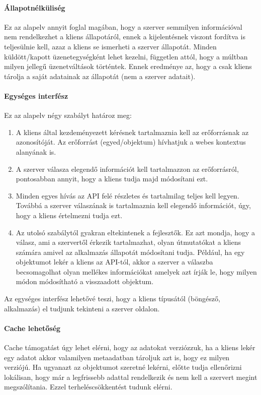 \paragraph{Állapotnélküliség} Ez az alapelv annyit foglal magában, hogy a szerver semmilyen információval nem rendelkezhet a kliens állapotáról, ennek a kijelentésnek viszont fordítva is teljesülnie kell, azaz a kliens se ismerheti a szerver állapotát. Minden küldött/kapott üzenetegységként lehet kezelni, független attól, hogy a múltban milyen jellegű üzenetváltások történtek. Ennek eredménye az, hogy a csak kliens tárolja a saját adatainak az állapotát (nem a szerver adatait).
\paragraph{Egységes interfész} Ez az alapelv négy szabályt határoz meg:
\begin{enumerate}
		\item A kliens által kezdeményezett kérésnek tartalmaznia kell az erőforrásnak az azonosítóját. Az erőforrást (egyed/objektum) hívhatjuk a webes kontextus alanyának is.
		\item A szerver válasza elegendő információt kell tartalmazzon az erőforrásról, pontosabban annyit, hogy a kliens tudja majd módosítani ezt.
		\item Minden egyes hívás az API felé részletes és tartalmilag teljes kell legyen. Továbbá a szerver válaszának is tartalmaznia kell elegendő információt, úgy, hogy a kliens értelmezni tudja ezt.
		\item Az utolsó szabálytól gyakran eltekintenek a fejlesztők. Ez azt mondja, hogy a válasz, ami a szervertől érkezik tartalmazhat, olyan útmutatókat a kliens számára amivel az alkalmazás állapotát módosítani tudja. Például, ha egy objektumot lekér a kliens az API-tól, akkor a szerver a válaszba becsomagolhat olyan mellékes információkat amelyek azt írják le, hogy milyen módon módosítható a visszaadott objektum.
\end{enumerate}
Az egységes interfész lehetővé teszi, hogy a kliens típusától (böngésző, alkalmazás) el tudjunk tekinteni a szerver oldalon.
\paragraph{Cache lehetőség} Cache támogatást úgy lehet elérni, hogy az adatokat verziózzuk, ha a kliens lekér egy adatot akkor valamilyen metaadatban tároljuk azt is, hogy ez milyen verziójú. Ha ugyanazt az objektumot szeretné lekérni, előtte tudja ellenőrizni lokálisan, hogy már a legfrissebb adattal rendelkezik és nem kell a szervert megint megszólítania. Ezzel terheléscsökkentést tudunk elérni.
